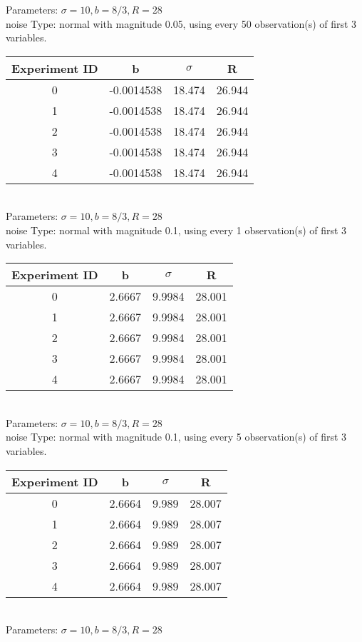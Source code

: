 \begin{multicols}{3}
Parameters: $\sigma=10, b=8/3, R=28$\\
noise Type: normal with magnitude 0.05, using every 50 observation(s) of first 3 variables.\\
\begin{tabular}{cccc}
\hline Experiment ID & b & $\sigma$ & R \\ \hline 
0 & -0.0014538 & 18.474 & 26.944\\ \hline 
 1 & -0.0014538 & 18.474 & 26.944\\ \hline 
 2 & -0.0014538 & 18.474 & 26.944\\ \hline 
 3 & -0.0014538 & 18.474 & 26.944\\ \hline 
 4 & -0.0014538 & 18.474 & 26.944\\ \hline 
 \end{tabular}\\
Parameters: $\sigma=10, b=8/3, R=28$\\
noise Type: normal with magnitude 0.1, using every 1 observation(s) of first 3 variables.\\
\begin{tabular}{cccc}
\hline Experiment ID & b & $\sigma$ & R \\ \hline 
0 & 2.6667 & 9.9984 & 28.001\\ \hline 
 1 & 2.6667 & 9.9984 & 28.001\\ \hline 
 2 & 2.6667 & 9.9984 & 28.001\\ \hline 
 3 & 2.6667 & 9.9984 & 28.001\\ \hline 
 4 & 2.6667 & 9.9984 & 28.001\\ \hline 
 \end{tabular}\\
Parameters: $\sigma=10, b=8/3, R=28$\\
noise Type: normal with magnitude 0.1, using every 5 observation(s) of first 3 variables.\\
\begin{tabular}{cccc}
\hline Experiment ID & b & $\sigma$ & R \\ \hline 
0 & 2.6664 & 9.989 & 28.007\\ \hline 
 1 & 2.6664 & 9.989 & 28.007\\ \hline 
 2 & 2.6664 & 9.989 & 28.007\\ \hline 
 3 & 2.6664 & 9.989 & 28.007\\ \hline 
 4 & 2.6664 & 9.989 & 28.007\\ \hline 
 \end{tabular}\\
Parameters: $\sigma=10, b=8/3, R=28$\\

\end{multicols}
